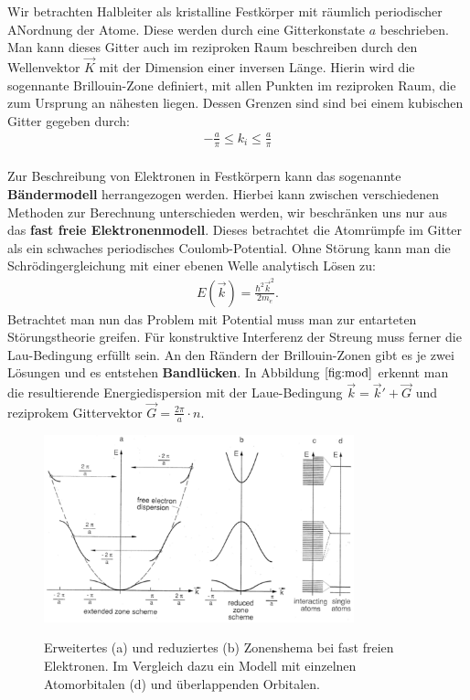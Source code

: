 Wir betrachten Halbleiter als kristalline Festkörper mit räumlich periodischer ANordnung der Atome. Diese werden durch eine Gitterkonstate $a$ beschrieben. Man kann dieses Gitter auch im reziproken Raum beschreiben durch den Wellenvektor $\Vec{K}$ mit der Dimension einer inversen Länge. Hierin wird die sogennante Brillouin-Zone definiert, mit allen Punkten im reziproken Raum, die zum Ursprung an nähesten liegen. Dessen Grenzen sind sind bei einem kubischen Gitter gegeben durch:
\begin{align}
    -\frac{a}{\pi} \leq k_i \leq \frac{a}{\pi}
\end{align}
\\
Zur Beschreibung von Elektronen in Festkörpern kann das sogenannte \textbf{Bändermodell} herrangezogen werden. Hierbei kann zwischen verschiedenen Methoden zur Berechnung unterschieden werden, wir beschränken uns nur aus das \textbf{fast freie Elektronenmodell}. Dieses betrachtet die Atomrümpfe im Gitter als ein schwaches periodisches Coulomb-Potential. Ohne Störung kann man die Schrödingergleichung mit einer ebenen Welle analytisch Lösen zu:
\begin{align}
    E(\Vec{k}) = \frac{\hbar^2\Vec{k}^2}{2m_e}.
\end{align}
Betrachtet man nun das Problem mit Potential muss man zur entarteten Störungstheorie greifen. Für konstruktive Interferenz der Streung muss ferner die Lau-Bedingung erfüllt sein. An den Rändern der Brillouin-Zonen gibt es je zwei Lösungen und es entstehen \textbf{Bandlücken}. In Abbildung $\autoref{fig:mod}$ erkennt man die resultierende Energiedispersion mit der Laue-Bedingung $ \Vec{k} = \Vec{k}' + \Vec{G}$ und reziprokem Gittervektor $\Vec{G} = \frac{2 \pi}{a} \cdot n$.
\begin{figure}
    \centering
    \caption{Erweitertes (a) und reduziertes (b) Zonenshema bei fast freien Elektronen. Im Vergleich dazu ein Modell mit einzelnen Atomorbitalen (d) und überlappenden Orbitalen.}
    \includegraphics[width=0.8\textwidth]{./fig/band_mod.png}
    \label{fig:mod}
\end{figure}
